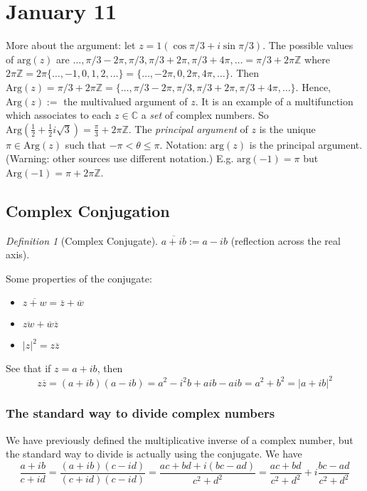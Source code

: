 \documentclass{article}
\theoremstyle{plain}
\theoremstyle{remark}
\newtheorem{definition}{Definition}
\newcommand{\Z}{{\mathbb Z}}
\newcommand{\C}{{\mathbb C}}
\begin{document}
\section{January 11}
More about the argument:
let $z = 1(\cos{\pi/3} + i\sin{\pi/3})$.
The possible values of $\mathrm{arg}(z)$ are
$\dots, \pi/3 - 2\pi, \pi/3, \pi/3 + 2\pi, \pi/3+4\pi, \dots = \pi/3 + 2\pi\Z$
where $2\pi\Z = 2\pi\{\dots, -1,0,1,2,\dots\} = \{\dots, -2\pi, 0, 2\pi, 4\pi, \dots\}$.
Then $\mathrm{Arg}(z) = \pi/3 + 2\pi\Z
= \{\dots, \pi/3 - 2\pi, \pi/3, \pi/3 + 2\pi, \pi/3 + 4\pi, \dots\}$.
Hence, $\mathrm{Arg}(z) :=$ the multivalued argument of $z$.
It is an example of a multifunction which associates to each $z \in \C$
a \emph{set} of complex numbers.
So $\mathrm{Arg}(\frac12 + \frac12i\sqrt{3}) = \frac{\pi}{3} + 2\pi\Z$.
The \emph{principal argument} of $z$ is the unique $\pi \in \mathrm{Arg}(z)$
such that $-\pi < \theta \leq \pi$.
Notation: $\mathrm{arg}(z)$ is the principal argument.
(Warning: other sources use different notation.)
E.g. $\mathrm{arg}(-1) = \pi$ but $\mathrm{Arg}(-1) = \pi + 2\pi\Z$.

\subsection{Complex Conjugation}
\begin{definition}[Complex Conjugate]
	$\overline{a+ib} := a-ib$ (reflection across the real axis).
\end{definition}
Some properties of the conjugate:
\begin{itemize}
	\item $\overline{z+w} = \overline{z} + \overline{w}$
	\item $\overline{zw} + \overline{w}\overline{z}$
	\item $\lvert z \rvert^2 = z\overline{z}$
\end{itemize}
See that if $z = a + ib$, then
\[
	z\overline{z} = (a+ib)(a-ib) = a^2 - i^2b + aib - aib = a^2 + b^2 = |a+ib|^2
\]

\subsubsection{The standard way to divide complex numbers}
We have previously defined the multiplicative inverse of a complex number,
but the standard way to divide is actually using the conjugate.
We have
\[
	\frac{a+ib}{c+id} = \frac{(a+ib)(c-id)}{(c+id)(c-id)}
	= \frac{ac + bd + i(bc-ad)}{c^2 + d^2}
	= \frac{ac + bd}{c^2 + d^2} + i \frac{bc - ad}{c^2 + d^2}
\]
\end{document}
